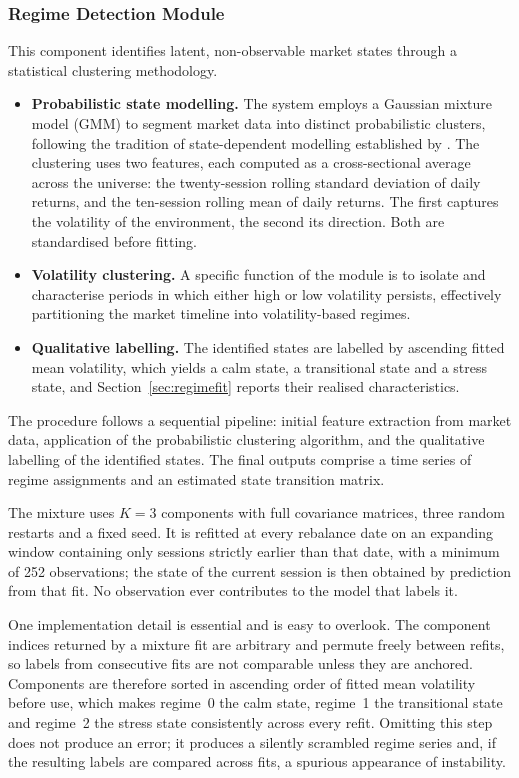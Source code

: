 \documentclass{singlecol-new}
\theoremstyle{TH}{
\newtheorem{lemma}{Lemma}
\newtheorem{theorem}[lemma]{Theorem}
\newtheorem{corrolary}[lemma]{Corrolary}
\newtheorem{conjecture}[lemma]{Conjecture}
\newtheorem{proposition}[lemma]{Proposition}
\newtheorem{claim}[lemma]{Claim}
\newtheorem{stheorem}[lemma]{Wrong Theorem}
\newtheorem{algorithm}{Algorithm}
}
\theoremstyle{THrm}{
\newtheorem{definition}{Definition}[section]
\newtheorem{question}{Question}[section]
\newtheorem{remark}{Remark}
\newtheorem{scheme}{Scheme}
}
\theoremstyle{THhit}{
\newtheorem{case}{Case}[section]
}
\begin{document}
\subsubsection{Regime Detection Module}

This component identifies latent, non-observable market states through a statistical
clustering methodology.

\begin{itemize}
\item \textbf{Probabilistic state modelling.} The system employs a Gaussian mixture model
(GMM) to segment market data into distinct probabilistic clusters, following the
tradition of state-dependent modelling established by \citet{hamilton89}. The clustering
uses two features, each computed as a cross-sectional average across the universe: the
twenty-session rolling standard deviation of daily returns, and the ten-session rolling
mean of daily returns. The first captures the volatility of the environment, the second
its direction. Both are standardised before fitting.
\item \textbf{Volatility clustering.} A specific function of the module is to isolate and
characterise periods in which either high or low volatility persists, effectively
partitioning the market timeline into volatility-based regimes.
\item \textbf{Qualitative labelling.} The identified states are labelled by ascending
fitted mean volatility, which yields a calm state, a transitional state and a stress
state, and Section~\ref{sec:regimefit} reports their realised characteristics.
\end{itemize}

The procedure follows a sequential pipeline: initial feature extraction from market data,
application of the probabilistic clustering algorithm, and the qualitative labelling of
the identified states. The final outputs comprise a time series of regime assignments and
an estimated state transition matrix.

The mixture uses $K = 3$ components with full covariance matrices, three random restarts
and a fixed seed. It is refitted at every rebalance date on an expanding window
containing only sessions strictly earlier than that date, with a minimum of 252
observations; the state of the current session is then obtained by prediction from that
fit. No observation ever contributes to the model that labels it.

One implementation detail is essential and is easy to overlook. The component indices
returned by a mixture fit are arbitrary and permute freely between refits, so labels from
consecutive fits are not comparable unless they are anchored. Components are therefore
sorted in ascending order of fitted mean volatility before use, which makes regime~0 the
calm state, regime~1 the transitional state and regime~2 the stress state consistently
across every refit. Omitting this step does not produce an error; it produces a silently
scrambled regime series and, if the resulting labels are compared across fits, a spurious
appearance of instability.
\end{document}
